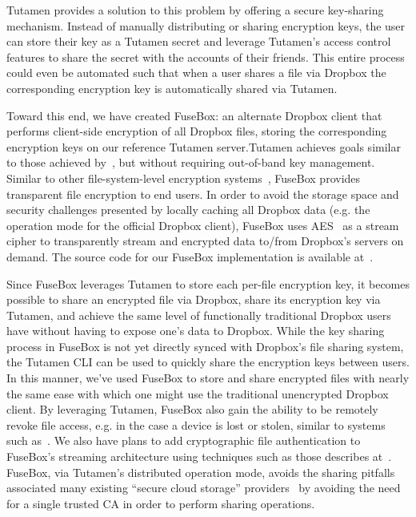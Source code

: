 Tutamen provides a solution to this problem by offering a secure
key-sharing mechanism. Instead of manually distributing or sharing
encryption keys, the user can store their key as a Tutamen secret and
leverage Tutamen's access control features to share the secret with
the accounts of their friends. This entire process could even be
automated such that when a user shares a file via Dropbox the
corresponding encryption key is automatically shared via Tutamen.

Toward this end, we have created FuseBox: an alternate Dropbox client
that performs client-side encryption of all Dropbox files, storing the
corresponding encryption keys on our reference Tutamen server.Tutamen
achieves goals similar to those achieved by~\cite{goh2003}, but
without requiring out-of-band key management. Similar to other
file-system-level encryption systems~\cite{blaze1993, Cattaneo2001,
  halcrow}, FuseBox provides transparent file encryption to end
users. In order to avoid the storage space and security challenges
presented by locally caching all Dropbox data (e.g. the operation mode
for the official Dropbox client), FuseBox uses AES~\cite{daemen1999,
  nist2001} as a stream cipher to transparently stream and encrypted
data to/from Dropbox's servers on demand.  The source code for our
FuseBox implementation is available at~\cite{fusebox}.

Since FuseBox leverages Tutamen to store each per-file encryption key,
it becomes possible to share an encrypted file via Dropbox, share its
encryption key via Tutamen, and achieve the same level of functionally
traditional Dropbox users have without having to expose one's data to
Dropbox. While the key sharing process in FuseBox is not yet directly
synced with Dropbox's file sharing system, the Tutamen CLI can be used
to quickly share the encryption keys between users. In this manner,
we've used FuseBox to store and share encrypted files with nearly the
same ease with which one might use the traditional unencrypted Dropbox
client. By leveraging Tutamen, FuseBox also gain the ability to be
remotely revoke file access, e.g. in the case a device is lost or
stolen, similar to systems such as~\cite{geambasu2011}. We also have
plans to add cryptographic file authentication to FuseBox's streaming
architecture using techniques such as those describes
at~\cite{McGrew2005}. FuseBox, via Tutamen's distributed operation
mode, avoids the sharing pitfalls associated many existing ``secure
cloud storage'' providers~\cite{wilson2014} by avoiding the need for a
single trusted CA in order to perform sharing operations.

